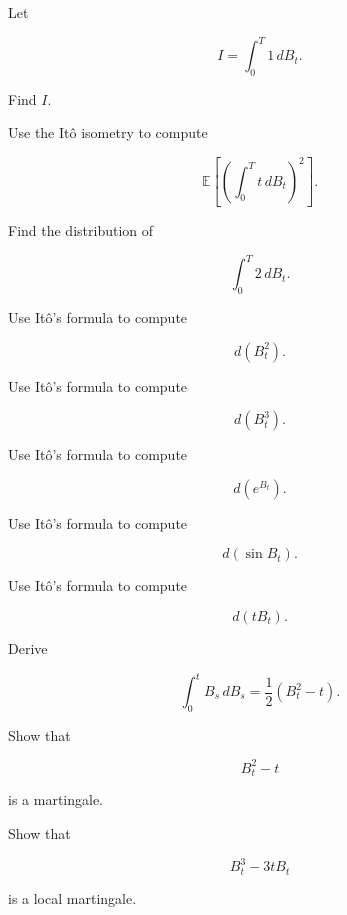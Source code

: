 \begin{exercise}[2]
Let

\[
I
=
\int_0^T
1\,dB_t.
\]

Find \(I\).
\end{exercise}

\begin{exercise}[2]
Use the It\^o isometry to compute

\[
\mathbb{E}
\left[
\left(
\int_0^T
t\,dB_t
\right)^2
\right].
\]
\end{exercise}

\begin{exercise}[2]
Find the distribution of

\[
\int_0^T
2\,dB_t.
\]
\end{exercise}

\begin{exercise}[2]
Use It\^o's formula to compute

\[
d(B_t^2).
\]
\end{exercise}

\begin{exercise}[2]
Use It\^o's formula to compute

\[
d(B_t^3).
\]
\end{exercise}

\begin{exercise}[2]
Use It\^o's formula to compute

\[
d(e^{B_t}).
\]
\end{exercise}

\begin{exercise}[2]
Use It\^o's formula to compute

\[
d(\sin B_t).
\]
\end{exercise}

\begin{exercise}[2]
Use It\^o's formula to compute

\[
d(tB_t).
\]
\end{exercise}

\begin{exercise}[3]
Derive

\[
\int_0^t
B_s\,dB_s
=
\frac12
(B_t^2-t).
\]
\end{exercise}

\begin{exercise}[3]
Show that

\[
B_t^2-t
\]

is a martingale.
\end{exercise}

\begin{exercise}[3]
Show that

\[
B_t^3-3tB_t
\]

is a local martingale.
\end{exercise}

